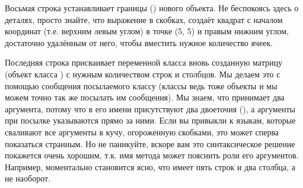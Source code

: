 \documentclass[a4paper,10pt,twoside]{book}
\begin{document}

Восьмая строка устанавливает границы () нового объекта.
Не беспокоясь здесь о деталях, просто знайте, что выражение в скобках, создаёт квадрат с началом координат (т.е. верхним левым углом) в точке (5, 5) и правым нижним углом, достаточно удалённым от него, чтобы вместить нужное количество ячеек.

Последняя строка присваивает переменной  класса  вновь созданную матрицу (объект класса ) с нужным количеством строк и столбцов. Мы делаем это с помощью сообщения  посылаемого классу  (классы ведь тоже объекты и мы можем точно так же посылать им сообщения). Мы знаем, что  принимает два аргумента, потому что в его имени присутствуют два двоеточия (\ct{:}), а аргументы при посылке указываются прямо за ними.
Если вы привыкли к языкам, которые сваливают все аргументы в кучу, огороженную скобками, это может сперва показаться странным. Но не паникуйте,
вскоре вам это синтаксическое решение покажется очень хорошим, т.к. имя метода может пояснить роли его аргументов. Например, моментально становится ясно, что  имеет пять строк и два столбца, а не наоборот.
\end{document}
